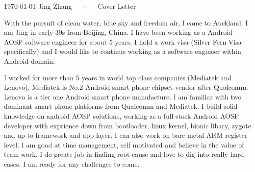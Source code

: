 \documentclass[12pt, a4paper]{awesome-cv}
\begin{document}
\makecvheader

\makecvfooter
  {\today}
  {Jing Zhang~~~·~~~Cover Letter}
  {}

\makelettertitle

\begin{cvletter}

   With the pursuit of clean water, blue sky and freedom air, I came to Auckland.
   I am Jing in early 30s from Beijing, China.
   I have been working as a Android AOSP software engineer for about 5 years.
   I hold a work visa (Silver Fern Visa specifically) and I would like to continue working as a software engineer within Android domain.


   I worked for more than 5 years in world top class companies (Mediatek and Lenovo).
   Mediatek is No.2 Android smart phone chipset vendor after Qualcomm.
   Lenovo is a tier one Android smart phone manufacture.
   I am familiar with two dominant smart phone platforms from Qualcomm and Mediatek.
   I build solid knowledge on android AOSP solutions, working as a full-stack Android AOSP developer with exprience down from bootloader, linux kernel, bionic libary, zygote and up to framework and app layer.
   I can also work on bare-metal ARM register level.
   I am good at time management, self motivated and believe in the value of team work.
   I do greate job in finding root cause and love to dig into really hard cases.
   I am ready for any challenges to come. 

\end{cvletter}


\makeletterclosing
\end{document}
